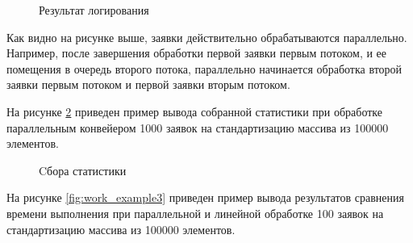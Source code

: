 \begin{figure}[h!]
	
	
	\caption{Результат логирования}
	
	\label{fig:work_example2}
	
\end{figure}


Как видно на рисунке выше, заявки действительно обрабатываются параллельно. Например, после завершения обработки первой заявки первым потоком, и ее помещения в очередь второго потока, параллельно начинается обработка второй заявки первым потоком и первой заявки вторым потоком.

На рисунке \ref{fig:stats2} приведен пример вывода собранной статистики при обработке параллельным конвейером 1000 заявок на стандартизацию массива из 100000 элементов.

\begin{figure}[h!]
	
	
	\caption{Cбора статистики}
	
	\label{fig:stats2}
	
\end{figure}


\newpage
На рисунке \ref{fig:work_example3} приведен пример вывода результатов сравнения времени выполнения при параллельной и линейной обработке 100 заявок на стандартизацию массива из 100000 элементов. 


